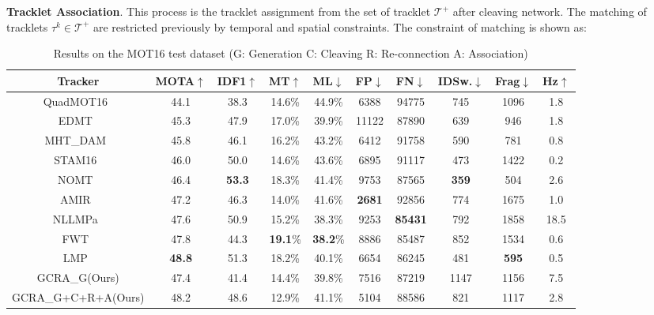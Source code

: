 \documentclass[5pt]{article}
\begin{document}
\noindent\textbf {Tracklet Association}. This process is the tracklet assignment from the set of tracklet $\mathcal{T}^+$ after cleaving network. The matching of tracklets $\tau^k\in \mathcal{T}^+$ are restricted previously by temporal and spatial constraints. The constraint of matching is shown as:
\begin{table*}[t]\footnotesize
\vspace{-0.2cm}
\begin{center}
\caption{Results on the MOT16 test dataset (G: Generation C: Cleaving R: Re-connection A: Association)} \label{tab:cap}
\vspace{0.2cm}
\begin{tabular}{c|c|c|c|c|c|c|c|c|c}

Tracker & MOTA$\uparrow$ & IDF1$\uparrow$ & MT$\uparrow$ & ML$\downarrow$ & FP$\downarrow$ & FN$\downarrow$ & IDSw.$\downarrow$ & Frag$\downarrow$ & Hz$\uparrow$
  \\
  \hline
  \hline
  QuadMOT16~\cite{son2017multi} & 44.1  & 38.3 & 14.6\% & 44.9\% & 6388 & 94775 & 745 & 1096 & 1.8 \\
  EDMT~\cite{kim2015multiple} & 45.3  & 47.9 & 17.0\% & 39.9\% & 11122 & 87890 & 639 & 946 & 1.8 \\
  MHT\_DAM~\cite{Henschel2017A} & 45.8  & 46.1 & 16.2\% & 43.2\% & 6412 & 91758 & 590 & 781 & 0.8 \\
  STAM16~\cite{chu2017online} & 46.0  & 50.0 & 14.6\% & 43.6\% & 6895 & 91117 & 473 & 1422 & 0.2 \\
  NOMT~\cite{Henschel2017A} & 46.4  & \textbf{53.3} & 18.3\% & 41.4\% & 9753 & 87565 & \textbf{359} & 504 & 2.6 \\
  AMIR~\cite{sadeghian2017tracking} & 47.2  & 46.3 & 14.0\% & 41.6\% & \textbf{2681} & 92856 & 774 & 1675 & 1.0 \\
  NLLMPa~\cite{wang2016joint} & 47.6  & 50.9 & 15.2\% & 38.3\% & 9253 & \textbf{85431} & 792 & 1858 & 18.5 \\
  FWT~\cite{Henschel2017A} & 47.8  & 44.3 & \textbf{19.1}\% & \textbf{38.2}\% & 8886 & 85487 & 852 & 1534 & 0.6 \\
  LMP~\cite{tang2017multiple} & \textbf{48.8}  & 51.3 & 18.2\% & 40.1\% & 6654 & 86245 & 481 & \textbf{595} & 0.5 \\
  \hline
  \hline
  GCRA\_G(Ours) & 47.4  & 41.4 & 14.4\% & 39.8\% & 7516 & 87219 & 1147 & 1156 & 7.5 \\
  GCRA\_G+C+R+A(Ours) & 48.2  & 48.6 & 12.9\% & 41.1\% & 5104 & 88586 & 821 & 1117 & 2.8\\
  \hline
\end{tabular}
\end{center}
\vspace{-0.7cm}
\end{table*}
\end{document}
